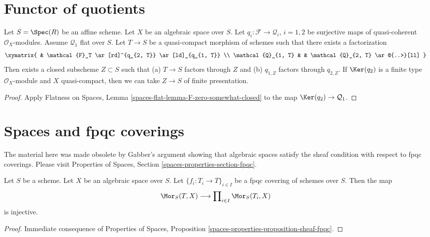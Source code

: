 \section{Functor of quotients}
\label{section-quotients}

\begin{lemma}
\label{lemma-factors-through-quotient}
Let $S = \Spec(R)$ be an affine scheme. Let $X$ be an algebraic space over
$S$. Let $q_i : \mathcal{F} \to \mathcal{Q}_i$, $i = 1, 2$
be surjective maps of quasi-coherent $\mathcal{O}_X$-modules.
Assume $\mathcal{Q}_1$ flat over $S$. Let $T \to S$ be a quasi-compact
morphism of schemes such that there exists a factorization
$$
\xymatrix{
& \mathcal{F}_T \ar[rd]^{q_{2, T}} \ar[ld]_{q_{1, T}} \\
\mathcal{Q}_{1, T} & & \mathcal{Q}_{2, T} \ar@{..>}[ll]
}
$$
Then exists a closed subscheme $Z \subset S$ such that
(a) $T \to S$ factors through $Z$ and (b)
$q_{1, Z}$ factors through $q_{2, Z}$.
If $\Ker(q_2)$ is a finite type $\mathcal{O}_X$-module and $X$
quasi-compact, then we can take $Z \to S$ of finite presentation.
\end{lemma}

\begin{proof}
Apply Flatness on Spaces, Lemma \ref{spaces-flat-lemma-F-zero-somewhat-closed}
to the map $\Ker(q_2) \to \mathcal{Q}_1$.
\end{proof}







\section{Spaces and fpqc coverings}
\label{section-fpqc}

\noindent
The material here was made obsolete by Gabber's argument showing that
algebraic spaces satisfy the sheaf condition with respect to fpqc
coverings. Please visit
Properties of Spaces, Section \ref{spaces-properties-section-fpqc}.

\begin{lemma}
\label{lemma-separated-fpqc}
Let $S$ be a scheme. Let $X$ be an algebraic space over $S$.
Let $\{f_i : T_i \to T\}_{i \in I}$ be a fpqc covering of schemes over $S$.
Then the map
$$
\Mor_S(T, X)
\longrightarrow
\prod\nolimits_{i \in I} \Mor_S(T_i, X)
$$
is injective.
\end{lemma}

\begin{proof}
Immediate consequence of
Properties of Spaces, Proposition
\ref{spaces-properties-proposition-sheaf-fpqc}.
\end{proof}

